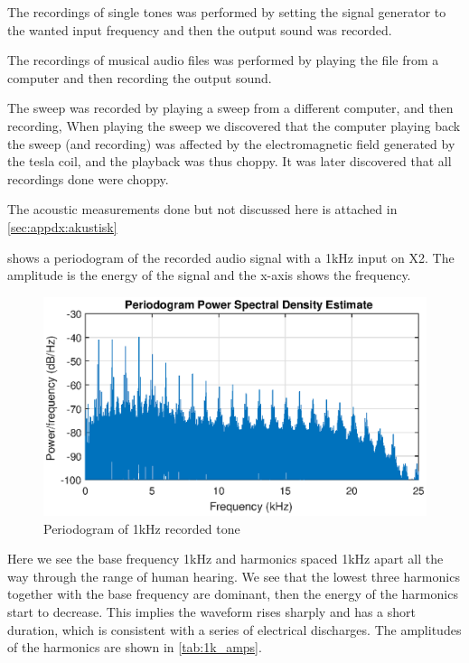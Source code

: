 The recordings of single tones was performed by setting the signal generator to the wanted input frequency and then the output sound was recorded.

The recordings of musical audio files was performed by playing the file from a computer and then recording the output sound.

The sweep was recorded by playing a sweep from a different computer, and then recording, When playing the sweep we discovered that the computer playing back the sweep (and recording) was affected by the electromagnetic field generated by the tesla coil, and the playback was thus choppy. It was later discovered that all recordings done were choppy.

The acoustic measurements done but not discussed here is attached in \cref{sec:appdx:akustisk}







 shows a periodogram of the recorded audio signal with a 1kHz input on X2. The amplitude is the energy of the signal and the x-axis shows the frequency.
\begin{figure}[H]
    \centering
    \includegraphics[trim={0cm 1.6cm 0cm 2cm},clip,width=\textwidth]{img/Periodogram_1khz-09.eps}
    \caption{Periodogram of 1kHz recorded tone}
    \label{fig:period_1k}
\end{figure}

Here we see the base frequency 1kHz and harmonics spaced 1kHz apart all the way through the range of human hearing. We see that the lowest three harmonics together with the base frequency are dominant, then the energy of the harmonics start to decrease. This implies the waveform rises sharply and has a short duration, which is consistent with a series of electrical discharges. The amplitudes of the harmonics are shown in \cref{tab:1k_amps}.

